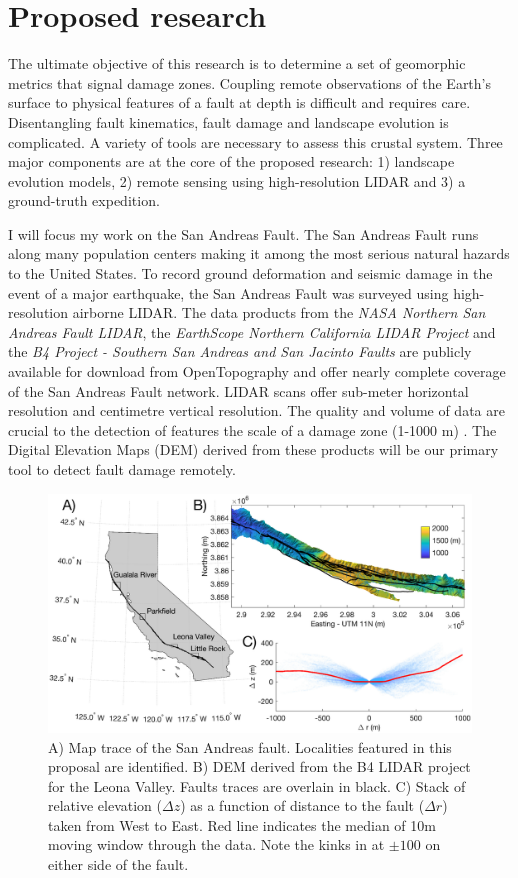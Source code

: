 \documentclass[12pt, notitlepage]{report}
\begin{document}
\section{Proposed research}

The ultimate objective of this research is to determine a set of geomorphic metrics that signal damage zones. Coupling remote observations of the Earth's surface to physical features of a fault at depth is difficult and requires care. Disentangling fault kinematics,  fault damage and landscape evolution is complicated. A variety of tools are necessary to assess this crustal system. Three major components are at the core of the proposed research: 1) landscape evolution models, 2) remote sensing using high-resolution LIDAR and 3) a ground-truth expedition. 

I will focus my work on the San Andreas Fault. The San Andreas Fault runs along many population centers making it among the most serious natural hazards to the United States. To record ground deformation and seismic damage in the event of a major earthquake, the San Andreas Fault was surveyed using high-resolution airborne LIDAR. The data products from the \textit{NASA Northern San Andreas Fault LIDAR}, the \textit{EarthScope Northern California LIDAR Project} and the \textit{B4 Project - Southern San Andreas and San Jacinto Faults} are publicly available for download from OpenTopography and offer nearly complete coverage of the San Andreas Fault network. LIDAR scans offer sub-meter horizontal resolution and centimetre vertical resolution. The quality and volume of data are crucial to the detection of features the scale of a damage zone (1-1000 m) \cite{Zielke2015FaultData}. The Digital Elevation Maps (DEM) derived from these products will be our primary tool to detect fault damage remotely.

\begin{figure}
    \centering
    \includegraphics[trim={2.5cm 0.2cm 3.2cm 1.2cm}, clip, width = 1\textwidth ]{figures/locale_topo_combinend.eps}
    \caption{A) Map trace of the San Andreas fault. Localities featured in this proposal are identified. B) DEM derived from the B4 LIDAR project for the Leona Valley. Faults traces are overlain in black. C)  Stack of relative elevation ($\Delta z$) as a function of distance to the fault ($\Delta r$) taken from West to East. Red line indicates the median of 10m moving window through the data. Note the kinks in at $\pm100$ on either side of the fault.}
    \label{fig:overview_topo_combined}
\end{figure}
\end{document}

